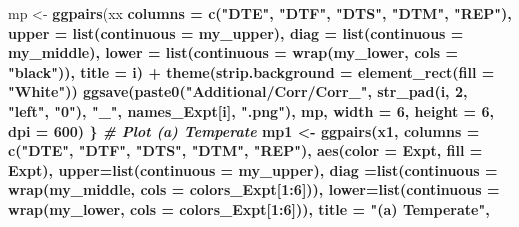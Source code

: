 \documentclass[
]{article}
\newenvironment{Shaded}{\begin{snugshade}}{\end{snugshade}}
\newcommand{\CommentTok}[1]{\textcolor[rgb]{0.56,0.35,0.01}{\textit{#1}}}
\newcommand{\DataTypeTok}[1]{\textcolor[rgb]{0.13,0.29,0.53}{#1}}
\newcommand{\DecValTok}[1]{\textcolor[rgb]{0.00,0.00,0.81}{#1}}
\newcommand{\KeywordTok}[1]{\textcolor[rgb]{0.13,0.29,0.53}{\textbf{#1}}}
\newcommand{\NormalTok}[1]{#1}
\newcommand{\OperatorTok}[1]{\textcolor[rgb]{0.81,0.36,0.00}{\textbf{#1}}}
\newcommand{\StringTok}[1]{\textcolor[rgb]{0.31,0.60,0.02}{#1}}
\begin{document}
\begin{Shaded}
\begin{Highlighting}[]
{{{{\NormalTok{  mp <-}\StringTok{ }\KeywordTok{ggpairs}\NormalTok{(xx }\OperatorTok{%
               \DataTypeTok{columns =} \KeywordTok{c}\NormalTok{(}\StringTok{"DTE"}\NormalTok{, }\StringTok{"DTF"}\NormalTok{, }\StringTok{"DTS"}\NormalTok{, }\StringTok{"DTM"}\NormalTok{, }\StringTok{"REP"}\NormalTok{), }
        \DataTypeTok{upper  =} \KeywordTok{list}\NormalTok{(}\DataTypeTok{continuous =}\NormalTok{ my_upper), }
        \DataTypeTok{diag   =} \KeywordTok{list}\NormalTok{(}\DataTypeTok{continuous =}\NormalTok{ my_middle),}
        \DataTypeTok{lower  =} \KeywordTok{list}\NormalTok{(}\DataTypeTok{continuous =} \KeywordTok{wrap}\NormalTok{(my_lower, }\DataTypeTok{cols =} \StringTok{"black"}\NormalTok{)),}
        \DataTypeTok{title  =}\NormalTok{ i) }\OperatorTok{+}\StringTok{ }
\StringTok{    }\KeywordTok{theme}\NormalTok{(}\DataTypeTok{strip.background =} \KeywordTok{element_rect}\NormalTok{(}\DataTypeTok{fill =} \StringTok{"White"}\NormalTok{))}
  \KeywordTok{ggsave}\NormalTok{(}\KeywordTok{paste0}\NormalTok{(}\StringTok{"Additional/Corr/Corr_"}\NormalTok{, }\KeywordTok{str_pad}\NormalTok{(i, }\DecValTok{2}\NormalTok{, }\StringTok{"left"}\NormalTok{, }\StringTok{"0"}\NormalTok{), }
                \StringTok{"_"}\NormalTok{, names_Expt[i], }\StringTok{".png"}\NormalTok{), }
\NormalTok{         mp, }\DataTypeTok{width =} \DecValTok{6}\NormalTok{, }\DataTypeTok{height =} \DecValTok{6}\NormalTok{, }\DataTypeTok{dpi =} \DecValTok{600}\NormalTok{)}
\NormalTok{\}}
\CommentTok{# Plot (a) Temperate}
\NormalTok{mp1 <-}\StringTok{ }\KeywordTok{ggpairs}\NormalTok{(x1, }\DataTypeTok{columns =} \KeywordTok{c}\NormalTok{(}\StringTok{"DTE"}\NormalTok{, }\StringTok{"DTF"}\NormalTok{, }\StringTok{"DTS"}\NormalTok{, }\StringTok{"DTM"}\NormalTok{, }\StringTok{"REP"}\NormalTok{), }
               \KeywordTok{aes}\NormalTok{(}\DataTypeTok{color =}\NormalTok{ Expt, }\DataTypeTok{fill =}\NormalTok{ Expt),}
        \DataTypeTok{upper=}\KeywordTok{list}\NormalTok{(}\DataTypeTok{continuous =}\NormalTok{ my_upper),}
        \DataTypeTok{diag =}\KeywordTok{list}\NormalTok{(}\DataTypeTok{continuous =} \KeywordTok{wrap}\NormalTok{(my_middle, }\DataTypeTok{cols =}\NormalTok{ colors_Expt[}\DecValTok{1}\OperatorTok{:}\DecValTok{6}\NormalTok{])),}
        \DataTypeTok{lower=}\KeywordTok{list}\NormalTok{(}\DataTypeTok{continuous =} \KeywordTok{wrap}\NormalTok{(my_lower,  }\DataTypeTok{cols =}\NormalTok{ colors_Expt[}\DecValTok{1}\OperatorTok{:}\DecValTok{6}\NormalTok{])),}
        \DataTypeTok{title =} \StringTok{"(a) Temperate"}\NormalTok{, }
}}}}}
\end{Highlighting}
\end{Shaded}
\end{document}
